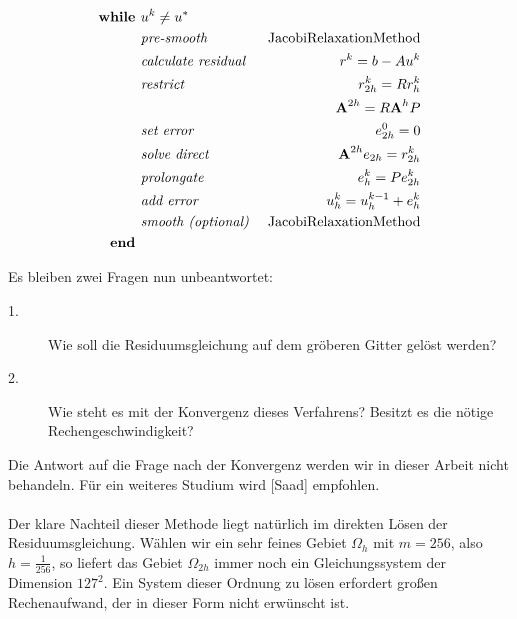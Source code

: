 \begin{eqnarray}
\textbf{while }                                 &u^{k} \ne u^{*} \notag \\
&\textit{pre-smooth }                         &\textnormal{JacobiRelaxationMethod} \notag \\
&\textit{calculate residual }        &r^{k} = b - Au^{k} \notag \\
&\textit{restrict }                         &r^{k}_{2h}=Rr^{k}_{h} \notag \\
&                                                                &{\textbf{A}}^{2h} = R{\textbf{A}}^{h}P \notag \\
&\textit{set error }                        &e^{0}_{2h} = 0 \notag \\
&\textit{solve direct }                        &{\textbf{A}}^{2h} e_{2h} = r^{k}_{2h} \notag \\
&\textit{prolongate }                        &e^{k}_{h} = Pe^{k}_{2h} \notag \\
&\textit{add error }                        &u^{k}_{h} = u^{k-1}_{h} + e^{k}_{h} \notag \\
&\textit{smooth (optional) }        &\textnormal{JacobiRelaxationMethod} \notag \\
\textbf{end } \notag
\end{eqnarray}

Es bleiben zwei Fragen nun unbeantwortet:
\begin{description}
\item[1.] Wie soll die Residuumsgleichung auf dem gröberen Gitter gelöst werden?
\item[2.] Wie steht es mit der Konvergenz dieses Verfahrens? Besitzt es die nötige Rechengeschwindigkeit?
\end{description}

Die Antwort auf die Frage nach der Konvergenz werden wir in dieser Arbeit nicht behandeln. Für ein weiteres Studium wird [Saad] empfohlen.\\ \\

Der klare Nachteil dieser Methode liegt natürlich im direkten Lösen der Residuumsgleichung. Wählen wir ein sehr feines Gebiet $\Omega_{h}$ mit $m = 256$, also $h = \frac {1} {256}$, so liefert das Gebiet $\Omega_{2h}$ immer noch ein Gleichungssystem der Dimension $127^{2}$. Ein System dieser Ordnung zu lösen erfordert großen Rechenaufwand, der in dieser Form nicht erwünscht ist. \\

